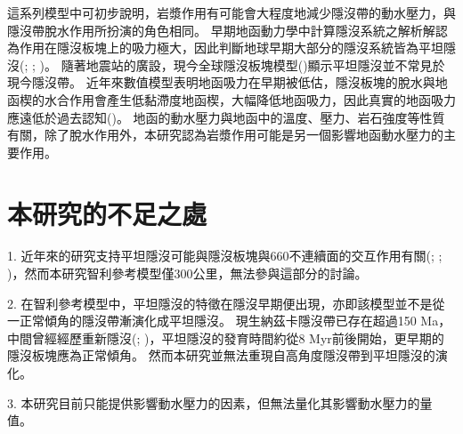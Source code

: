 這系列模型中可初步說明，岩漿作用有可能會大程度地減少隱沒帶的動水壓力，與隱沒帶脫水作用所扮演的角色相同。
早期地函動力學中計算隱沒系統之解析解認為作用在隱沒板塊上的吸力極大，因此判斷地球早期大部分的隱沒系統皆為平坦隱沒(\citealp{tovish1978mantle}; \citealp{vlaar1983thermal}; \citealp{abbott1994flat})。
隨著地震站的廣設，現今全球隱沒板塊模型(\citealp{hayes2018slab2})顯示平坦隱沒並不常見於現今隱沒帶。
近年來數值模型表明地函吸力在早期被低估，隱沒板塊的脫水與地函楔的水合作用會產生低黏滯度地函楔，大幅降低地函吸力，因此真實的地函吸力應遠低於過去認知(\citealp{Manea2007})。
地函的動水壓力與地函中的溫度、壓力、岩石強度等性質有關，除了脫水作用外，本研究認為岩漿作用可能是另一個影響地函動水壓力的主要作用。


\section{本研究的不足之處}

1. 近年來的研究支持平坦隱沒可能與隱沒板塊與660不連續面的交互作用有關(\citealp{chen2019southward}; \citealp{schellart2020control}; \citealp{Schellart2021})，然而本研究智利參考模型僅300公里，無法參與這部分的討論。

2. 在智利參考模型中，平坦隱沒的特徵在隱沒早期便出現，亦即該模型並不是從一正常傾角的隱沒帶漸演化成平坦隱沒。
現生納茲卡隱沒帶已存在超過150 Ma，中間曾經經歷重新隱沒(\citealp{chen2019southward}; \citealp{hu2021southward})，平坦隱沒的發育時間約從8 Myr前後開始，更早期的隱沒板塊應為正常傾角。
然而本研究並無法重現自高角度隱沒帶到平坦隱沒的演化。

3. 本研究目前只能提供影響動水壓力的因素，但無法量化其影響動水壓力的量值。
